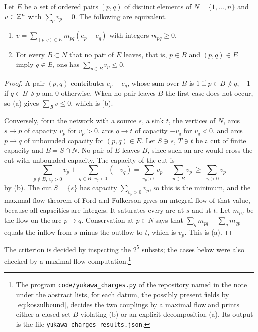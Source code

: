 \begin{lemma}\label{lem:flow}
Let $E$ be a set of ordered pairs $(p,q)$ of distinct elements of
$N=\{1,\dots,n\}$ and $v\in\mathbb{Z}^n$ with $\sum_pv_p=0$. The following are
equivalent.
\begin{enumerate}[label=\textup{(\alph*)},leftmargin=*,itemsep=1pt]
\item $v=\sum_{(p,q)\in E}m_{pq}(e_p-e_q)$ with integers $m_{pq}\ge0$.
\item For every $B\subset N$ that no pair of $E$ leaves, that is, $p\in B$
and $(p,q)\in E$ imply $q\in B$, one has $\sum_{p\in B}v_p\le0$.
\end{enumerate}
\end{lemma}
\begin{proof}
A pair $(p,q)$ contributes $e_p-e_q$, whose sum over $B$ is $1$ if
$p\in B\not\ni q$, $-1$ if $q\in B\not\ni p$ and $0$ otherwise. When no pair
leaves $B$ the first case does not occur, so (a) gives
$\sum_Bv\le0$, which is (b).

Conversely, form the network with a source $s$, a sink $t$, the vertices
of $N$, arcs $s\to p$ of capacity $v_p$ for $v_p>0$, arcs $q\to t$ of
capacity $-v_q$ for $v_q<0$, and arcs $p\to q$ of unbounded capacity for
$(p,q)\in E$. Let $S\ni s$, $T\ni t$ be a cut of finite capacity and
$B=S\cap N$. No pair of $E$ leaves $B$, since such an arc would cross the
cut with unbounded capacity. The capacity of the cut is
\[
 \sum_{p\notin B,\ v_p>0}v_p+\sum_{q\in B,\ v_q<0}(-v_q)
 =\sum_{v_p>0}v_p-\sum_{p\in B}v_p\ \ge\ \sum_{v_p>0}v_p
\]
by (b). The cut $S=\{s\}$ has capacity $\sum_{v_p>0}v_p$, so this is the
minimum, and the maximal flow theorem of Ford and Fulkerson \cite{FF56}
gives an integral flow of that value, because all capacities are
integers. It saturates every arc at $s$ and at $t$. Let $m_{pq}$ be the
flow on the arc $p\to q$. Conservation at $p\in N$ says that
$\sum_qm_{pq}-\sum_qm_{qp}$ equals the inflow from $s$ minus the outflow
to $t$, which is $v_p$. This is (a).
\end{proof}

The criterion is decided by inspecting the $2^5$ subsets; the cases below
were also checked by a maximal flow computation.\footnote{The program
\texttt{code/yukawa\_charges.py} of the repository named in the note under
the abstract lists, for each datum, the possibly present fields by
\eqref{eq:koszulbound}, decides the two couplings by a maximal flow and
prints either a closed set $B$ violating (b) or an explicit decomposition
(a). Its output is the file \texttt{yukawa\_charges\_results.json}.}

